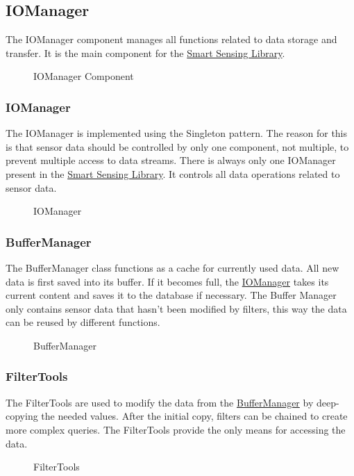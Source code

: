 \documentclass[12pt]{article}
\newcounter{fr}
\begin{document}
\subsection{IOManager}
The IOManager component manages all functions related to data storage and transfer. It is the main component for the \hyperref[fig:bild2]{Smart Sensing Library}.
\begin{figure}[ht]
\centering

\caption{\label{fig:bild5} IOManager Component}
\end{figure}


\subsubsection{IOManager}
The IOManager is implemented using the Singleton pattern. The reason for this is that sensor data should be controlled by only one component, not multiple, to prevent multiple access to data streams. There is always only one IOManager present in the \hyperref[fig:bild2]{Smart Sensing Library}. It controls all data operations related to sensor data.
\begin{figure}[ht]
\centering

\caption{\label{fig:bild6} IOManager}
\end{figure}

\subsubsection{BufferManager}
The BufferManager class functions as a cache for currently used data. All new data is first saved into its buffer. If it becomes full, the \hyperref[fig:bild5]{IOManager} takes its current content and saves it to the database if necessary. The Buffer Manager only contains sensor data that hasn't been modified by filters, this way the data can be reused by different functions.
\begin{figure}[ht]
\centering

\caption{\label{fig:bild7} BufferManager}
\end{figure}

\newpage
\subsubsection{FilterTools}
The FilterTools are used to modify the data from the \hyperref[fig:bild7]{BufferManager} by deep-copying the needed values. After the initial copy, filters can be chained to create more complex queries. The FilterTools provide the only means for accessing the data.
\begin{figure}[ht]
\centering

\caption{\label{fig:bild8} FilterTools}
\end{figure}
\newpage
\end{document}
